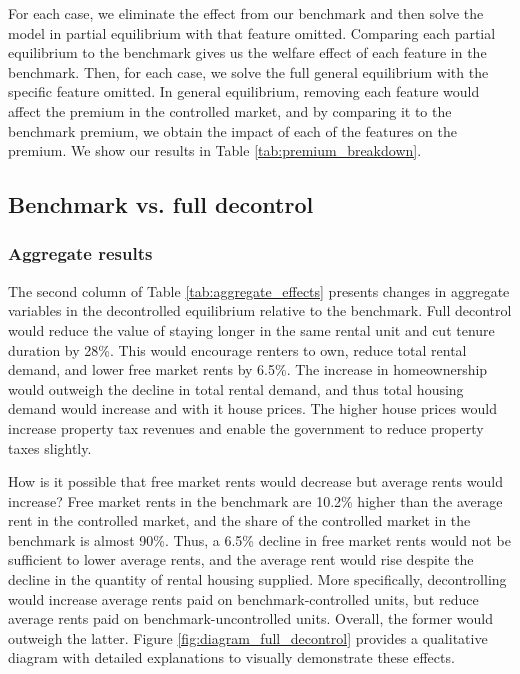 \documentclass[parskip=full]{article}
\begin{document}
For each case, we eliminate the effect from our benchmark and then solve the model in partial equilibrium with that feature omitted. Comparing each partial equilibrium to the benchmark gives us the welfare effect of each feature in the benchmark. Then, for each case, we solve the full general equilibrium with the specific feature omitted. In general equilibrium, removing each feature would affect the premium in the controlled market, and by comparing it to the benchmark premium, we obtain the impact of each of the features on the premium. We show our results in Table \ref{tab:premium_breakdown}.

\subsection{Benchmark vs. full decontrol}

\subsubsection{Aggregate results} The second column of Table \ref{tab:aggregate_effects} presents changes in aggregate variables in the decontrolled equilibrium relative to the benchmark. Full decontrol would reduce the value of staying longer in the same rental unit and cut tenure duration by 28\%. This would encourage renters to own, reduce total rental demand, and lower free market rents by 6.5\%. The increase in homeownership would outweigh the decline in total rental demand, and thus total housing demand would increase and with it house prices. The higher house prices would increase property tax revenues and enable the government to reduce property taxes slightly.

How is it possible that free market rents would decrease but average rents would increase? Free market rents in the benchmark are 10.2\% higher than the average rent in the controlled market, and the share of the controlled market in the benchmark is almost 90\%. Thus, a 6.5\% decline in free market rents would not be sufficient to lower average rents, and the average rent would rise despite the decline in the quantity of rental housing supplied. More specifically, decontrolling would increase average rents paid on benchmark-controlled units, but reduce average rents paid on benchmark-uncontrolled units. Overall, the former would outweigh the latter. Figure \ref{fig:diagram_full_decontrol} provides a qualitative diagram with detailed explanations to visually demonstrate these effects.
\end{document}
